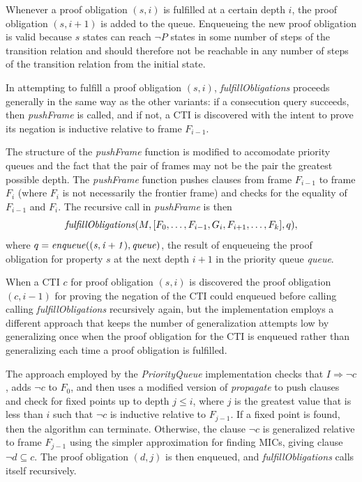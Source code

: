\documentclass[12pt,a4paper,twoside,openright]{report}
\begin{document}
{Whenever a proof obligation $(s,i)$ is fulfilled at a certain depth $i$, the proof obligation
$(s, i + 1)$ is added to the queue. Enqueueing the new proof obligation is valid
because $s$ states can reach $\neg P$ states in some
number of steps of the transition relation and should therefore
not be reachable in any number of steps of the transition relation from the initial state.

In attempting to fulfill a proof obligation $(s,i)$, {\it fulfillObligations} proceeds
generally in the same way as the other variants: if a consecution query succeeds,
then {\it pushFrame} is called, and if not, a CTI is discovered with the intent to
prove its negation is inductive relative to frame $F_{i - 1}$.

The structure of the {\it pushFrame} function is modified to accomodate priority queues
and the fact that the pair of frames may not be the pair the greatest possible depth.
The {\it pushFrame} function pushes clauses from frame $F_{i - 1}$ to frame $F_i$ (where
$F_i$ is not necessarily the frontier frame) and checks
for the equality of $F_{i - 1}$ and $F_i$.
The recursive call in {\it pushFrame} is then
$${\it fulfillObligations}(M,[F_0,\ldots,F_{i - 1},G_i,F_{i + 1}, \ldots, F_k], q),$$
where $q = {\it enqueue((s, i+1), queue)}$, the result of enqueueing the proof obligation
for property $s$ at the next depth $i + 1$ in the priority queue {\it queue}.

When a CTI $c$ for proof obligation $(s,i)$ is discovered the proof obligation $(c,i - 1)$
for proving the negation of the CTI could enqueued before calling
calling {\it fulfillObligations} recursively again,
but the implementation employs a different approach that keeps the number of
generalization attempts low by generalizing once when the proof obligation
for the CTI is enqueued rather than generalizing each time a proof obligation
is fulfilled.

The approach employed by the {\it PriorityQueue} implementation checks
that $I \Rightarrow \neg c$, adds $\neg c$ to $F_0$, and then uses a modified
version of {\it propagate} to push clauses and check for fixed points up to
depth $j \leq i$, where $j$ is the greatest value that is less than $i$
such that $\neg c$ is inductive relative to $F_{j - 1}$. If a fixed point is
found, then the algorithm can terminate. Otherwise, the clause
$\neg c$ is generalized relative to frame $F_{j - 1}$
using the simpler approximation for finding MICs, giving clause
$\neg d \subseteq c$. The proof obligation $(d,j)$ is then enqueued, and
{\it fulfillObligations} calls itself recursively.

}
\end{document}

